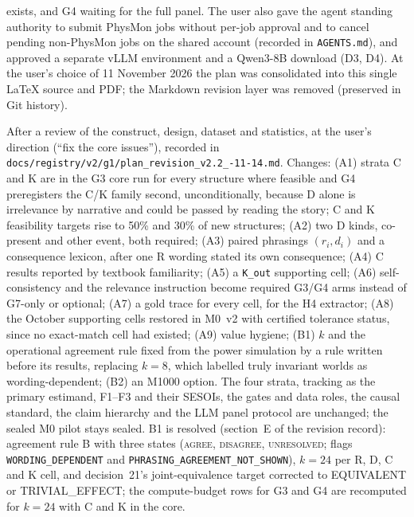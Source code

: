 \documentclass[10pt,a4paper]{article}
\begin{document}
\begin{description}
exists, and G4 waiting for the full panel. The user also gave the agent standing authority to submit PhysMon jobs
without per-job approval and to cancel pending non-PhysMon jobs on the shared account (recorded in
\texttt{AGENTS.md}), and approved a separate vLLM environment and a Qwen3-8B download (D3, D4). At the user's choice of 11 November 2026 the plan was consolidated into this single LaTeX source and
PDF; the Markdown revision layer was removed (preserved in Git history).
\item[14 November 2026 (v2.2), plan amendments.] After a review of the construct, design, dataset and statistics, at the user's
direction (``fix the core issues''), recorded in \texttt{docs/\allowbreak registry/\allowbreak v2/\allowbreak g1/\allowbreak plan\_\allowbreak revision\_\allowbreak v2.2\_-11-14.md}. Changes:
(A1) strata C and K are in the G3 core run for every structure where feasible and G4 preregisters the C/K family second,
unconditionally, because D alone is irrelevance by narrative and could be passed by reading the story; C and K feasibility
targets rise to 50\% and 30\% of new structures; (A2) two D kinds, co-present and other event, both required; (A3) paired
phrasings $(r_i,d_i)$ and a consequence lexicon, after one R wording stated its own consequence; (A4) C results reported by
textbook familiarity; (A5) a \texttt{K\_out} supporting cell; (A6) self-consistency and the relevance instruction become
required G3/G4 arms instead of G7-only or optional; (A7) a gold trace for every cell, for the H4 extractor; (A8) the October
supporting cells restored in M0~v2 with certified tolerance status, since no exact-match cell had existed; (A9) value hygiene;
(B1) $k$ and the operational agreement rule fixed from the power simulation by a rule written before its results, replacing
$k=8$, which labelled truly invariant worlds as wording-dependent; (B2) an M1000 option. The four strata, tracking as the primary
estimand, F1--F3 and their SESOIs, the gates and data roles, the causal standard, the claim hierarchy and the LLM panel
protocol are unchanged; the sealed M0 pilot stays sealed. B1 is resolved (section~E of the revision record): agreement rule B with three states (\textsc{agree}, \textsc{disagree}, \textsc{unresolved}; flags \texttt{WORDING\_DEPENDENT} and \texttt{PHRASING\_AGREEMENT\_NOT\_SHOWN}), $k=24$ per R, D, C and K cell, and decision~21's joint-equivalence target corrected to EQUIVALENT or TRIVIAL\_EFFECT; the compute-budget rows for G3 and G4 are recomputed for $k=24$ with C and K in the core.
\end{description}
\end{document}
